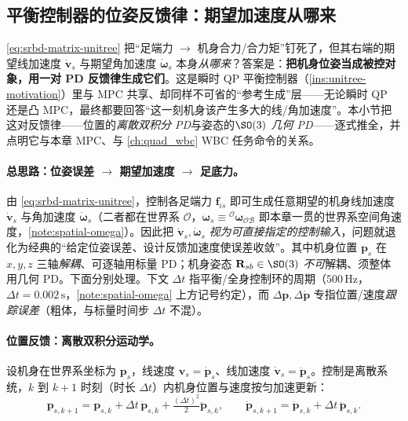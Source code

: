 \subsection{平衡控制器的位姿反馈律：期望加速度从哪来}
\label{subsec:bal-feedback}

\cref{eq:srbd-matrix-unitree} 把“足端力 $\to$ 机身合力/合力矩”钉死了，但其右端的期望线加速度 $\dot{\boldsymbol{v}}_s$ 与期望角加速度 $\dot{\boldsymbol{\omega}}_s$ 本身\emph{从哪来}？答案是：\textbf{把机身位姿当成被控对象，用一对 PD 反馈律生成它们}。这是瞬时 QP 平衡控制器（\cref{ins:unitree-motivation}）里与 MPC 共享、却同样不可省的“参考生成”层——无论瞬时 QP 还是凸 MPC，最终都要回答“这一刻机身该产生多大的线/角加速度”。本小节把这对反馈律——位置的\emph{离散双积分 PD}与姿态的\emph{$\SO(3)$ 几何 PD}——逐式推全，并点明它与本章 MPC、与 \cref{ch:quad_wbc} WBC 任务命令的关系\cite{unitree2023quadruped}。

\paragraph{总思路：位姿误差 $\to$ 期望加速度 $\to$ 足底力。}
由 \cref{eq:srbd-matrix-unitree}，控制各足端力 $\boldsymbol{f}_{is}$ 即可生成任意期望的机身线加速度 $\dot{\boldsymbol{v}}_s$ 与角加速度 $\dot{\boldsymbol{\omega}}_s$（二者都在世界系 $\mathcal{O}$，$\boldsymbol{\omega}_s\equiv{}^{\mathcal{O}}\boldsymbol{\omega}_{\mathcal{OB}}$ 即本章一贯的世界系空间角速度，\cref{note:spatial-omega}）。因此把 $\dot{\boldsymbol{v}}_s,\dot{\boldsymbol{\omega}}_s$ \emph{视为可直接指定的控制输入}，问题就退化为经典的“给定位姿误差、设计反馈加速度使误差收敛”。其中机身位置 $\boldsymbol{p}_s$ 在 $x,y,z$ 三轴\emph{解耦}、可逐轴用标量 PD；机身姿态 $\mathbf{R}_{sb}\in\SO(3)$ \emph{不可}解耦、须整体用几何 PD。下面分别处理。下文 $\Delta t$ 指平衡/全身控制环的周期（$500\,\mathrm{Hz}$，$\Delta t=0.002\,\mathrm{s}$，\cref{note:spatial-omega} 上方记号约定），而 $\Delta\boldsymbol{p},\Delta\dot{\boldsymbol{p}}$ 专指位置/速度\emph{跟踪误差}（粗体，与标量时间步 $\Delta t$ 不混）。

\paragraph{ 位置反馈：离散双积分运动学。}
设机身在世界系坐标为 $\boldsymbol{p}_s$，线速度 $\boldsymbol{v}_s=\dot{\boldsymbol{p}}_s$、线加速度 $\dot{\boldsymbol{v}}_s=\ddot{\boldsymbol{p}}_s$。控制是离散系统，$k$ 到 $k+1$ 时刻（时长 $\Delta t$）内机身位置与速度按匀加速更新\cite{unitree2023quadruped}：
\begin{equation}
  \boldsymbol{p}_{s,k+1}=\boldsymbol{p}_{s,k}+\Delta t\,\dot{\boldsymbol{p}}_{s,k}+\tfrac{(\Delta t)^2}{2}\ddot{\boldsymbol{p}}_{s,k},
  \qquad
  \dot{\boldsymbol{p}}_{s,k+1}=\dot{\boldsymbol{p}}_{s,k}+\Delta t\,\ddot{\boldsymbol{p}}_{s,k}.
  \label{eq:bal-disc-kin}
\end{equation}


